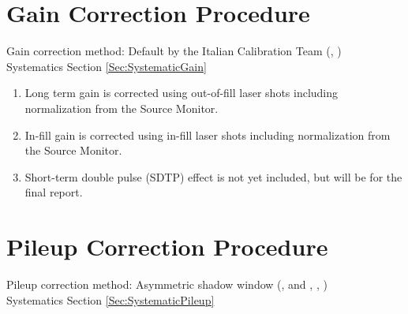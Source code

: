 \section{Gain Correction Procedure}

	Gain correction method: Default by the Italian Calibration Team (, \cite{60HGain}) \\
	\noindent Systematics Section \ref{Sec:SystematicGain}

	\begin{enumerate}
		\item{Long term gain is corrected using out-of-fill laser shots including normalization from the Source Monitor.}
		\item{In-fill gain is corrected using in-fill laser shots including normalization from the Source Monitor.}
		\item{Short-term double pulse (SDTP) effect is not yet included, but will be for the final report.}
	\end{enumerate}


\section{Pileup Correction Procedure}
\label{Sec:PileupCorrection}

	Pileup correction method: Asymmetric shadow window (, \cite{Pileup1} and , \cite{Pileup2}, \cite{Pileup3}) \\
	\noindent Systematics Section \ref{Sec:SystematicPileup}

